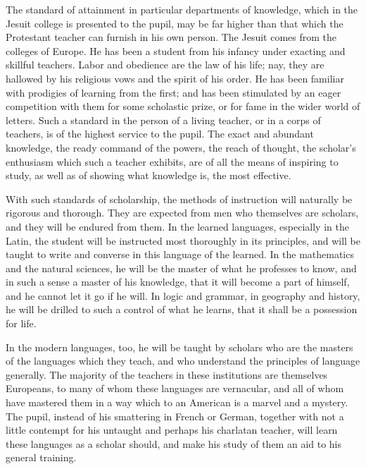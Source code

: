 \documentclass[]{book}
\begin{document}
The standard of attainment in particular departments of knowledge, which in the Jesuit college is presented to the pupil, may be far higher than that which the Protestant teacher can furnish in his own person. The Jesuit comes from the colleges of Europe. He has been a student from his infancy under exacting and skillful teachers. Labor and obedience are the law of his life; nay, they are hallowed by his religious vows and the spirit of his order. He has been familiar with prodigies of learning from the first; and has been stimulated by an eager competition with them for some scholastic prize, or for fame in the wider world of letters. Such a standard in the person of a living teacher, or in a corps of teachers, is of the highest service to the pupil. The exact and abundant knowledge, the ready command of the powers, the reach of thought, the scholar's enthusiasm which such a teacher exhibits, are of all the means of inspiring to study, as well as of showing what knowledge is, the most effective.

With such standards of scholarship, the methods of instruction will naturally be rigorous and thorough. They are expected from men who themselves are scholars, and they will be endured from them. In the learned languages, especially in the Latin, the student will be instructed most thoroughly in its principles, and will be taught to write and converse in this language of the learned. In the mathematics and the natural sciences, he will be the master of what he professes to know, and in such a sense a master of his knowledge, that it will become a part of himself, and he cannot let it go if he will. In logic and grammar, in geography and history, he will be drilled to such a control of what he learns, that it shall be a possession for life.

In the modern languages, too, he will be taught by scholars who are the masters of the languages which they teach, and who understand the principles of language generally. The majority of the teachers in these institutions are themselves Europeans, to many of whom these languages are vernacular, and all of whom have mastered them in a way which to an American is a marvel and a mystery. The pupil, instead of his smattering in French or German, together with not a little contempt for his untaught and perhaps his charlatan teacher, will learn these languages as a scholar should, and make his study of them an aid to his general training.
\end{document}
